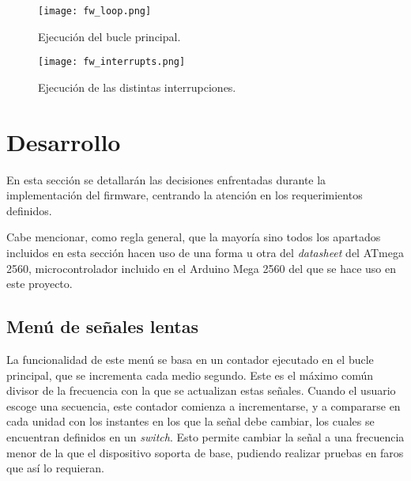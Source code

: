 \begin{figure}[h!]
    \centering
    \texttt{[image: fw\_loop.png]}
    \caption{Ejecución del bucle principal.}
    \label{fig:fw_loop}
\end{figure}

\begin{figure}[h!]
    \centering
    \texttt{[image: fw\_interrupts.png]}
    \caption{Ejecución de las distintas interrupciones.}
    \label{fig:fw_interrupts}
\end{figure}

\section{Desarrollo}

En esta sección se detallarán las decisiones enfrentadas durante la implementación del firmware, centrando la atención en los requerimientos definidos.


Cabe mencionar, como regla general, que la mayoría sino todos los apartados incluidos en esta sección hacen uso de una forma u otra del \textit{datasheet} del ATmega 2560\cite{atmega2560}, microcontrolador incluido en el Arduino Mega 2560 del que se hace uso en este proyecto.

\subsection{Menú de señales lentas}

La funcionalidad de este menú se basa en un contador ejecutado en el bucle principal, que se incrementa cada medio segundo. Este es el máximo común divisor de la frecuencia con la que se actualizan estas señales. Cuando el usuario escoge una secuencia, este contador comienza a incrementarse, y a compararse en cada unidad con los instantes en los que la señal debe cambiar, los cuales se encuentran definidos en un \textit{switch}. Esto permite cambiar la señal a una frecuencia menor de la que el dispositivo soporta de base, pudiendo realizar pruebas en faros que así lo requieran.

